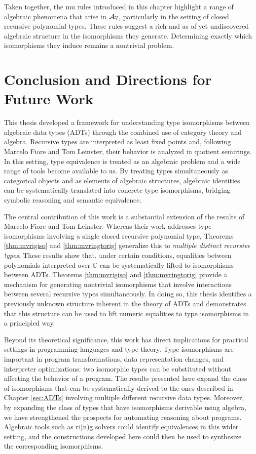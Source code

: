 \documentclass{msthesis}
\theoremstyle{definition}
\begin{document}
Taken together, the mu rules introduced in this chapter highlight a range of algebraic phenomena that arise in $\mathcal{A}_{\mathbb{V}}$, particularly in the setting of closed recursive polynomial types.  These rules suggest a rich and as of yet undiscovered algebraic structure in the isomorphisms they generate.  Determining exactly which isomorphisms they induce remains a nontrivial problem.  


\chapter{Conclusion and Directions for Future Work}

This thesis developed a framework for understanding type isomorphisms between algebraic data types (ADTs) through the combined use of category theory and algebra.  Recursive types are interpreted as least fixed points and, following Marcelo Fiore and Tom Leinster, their behavior is analyzed in quotient semirings.  In this setting, type equivalence is treated as an algebraic problem and a wide range of tools become available to us.  By treating types simultaneously as categorical objects and as elements of algebraic structures, algebraic identities can be systematically translated into concrete type isomorphisms, bridging symbolic reasoning and semantic equivalence.

The central contribution of this work is a substantial extension of the results of Marcelo Fiore and Tom Leinster.  Whereas their work addresses type isomorphisms involving a single closed recursive polynomial type, Theorems \ref{thm:mvrigiso} and \ref{thm:mvringtorig} generalize this to \textit{multiple distinct recursive types}.  These results show that, under certain conditions, equalities between polynomials interpreted over $\mathbb{C}$ can be systematically lifted to isomorphisms between ADTs.  Theorems \ref{thm:mvrigiso} and \ref{thm:mvringtorig} provide a mechanism for generating nontrivial isomorphisms that involve interactions between several recursive types simultaneously.  In doing so, this thesis identifies a previously unknown structure inherent in the theory of ADTs and demonstrates that this structure can be used to lift numeric equalities to type isomorphisms in a principled way.

Beyond its theoretical significance, this work has direct implications for practical settings in programming languages and type theory.  Type isomorphisms are important in program transformations, data representation changes, and interpreter optimizations: two isomorphic types can be substituted without affecting the behavior of a program. The results presented here expand the class of isomorphisms that can be systematically derived to the ones described in Chapter \ref{sec:ADTs} involving multiple different recursive data types.  Moreover, by expanding the class of types that have isomorphisms derivable using algebra, we have strengthened the prospects for automating reasoning about programs.  Algebraic tools such as ri(n)g solvers could identify equivalences in this wider setting, and the constructions developed here could then be used to synthesize the corresponding isomorphisms.  
\end{document}
